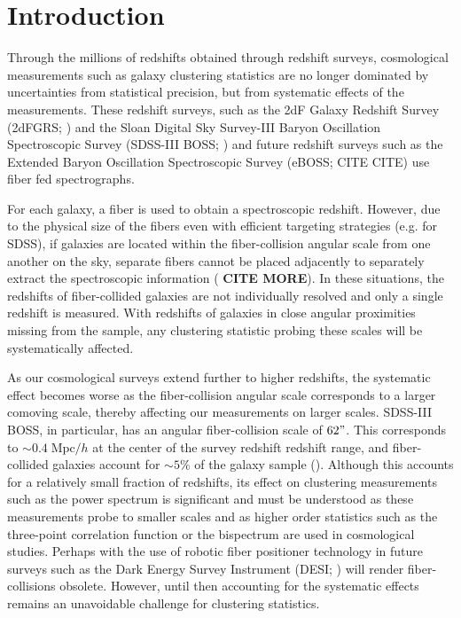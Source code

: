 \documentclass{emulateapj}
\begin{document}
\section{Introduction} 
Through the millions of redshifts obtained through redshift surveys, cosmological measurements such as galaxy clustering statistics are no longer dominated by uncertainties from statistical precision, but from systematic effects of the measurements. These redshift surveys, such as the 2dF Galaxy Redshift Survey (2dFGRS; \citealt{Colless:1999aa}) and the Sloan Digital Sky Survey-III Baryon Oscillation Spectroscopic Survey (SDSS-III BOSS; \citealt{Anderson:2012aa, Dawson:2013aa}) and future redshift surveys such as the Extended Baryon Oscillation Spectroscopic Survey (eBOSS; CITE CITE) use fiber fed spectrographs. 

For each galaxy, a fiber is used to obtain a spectroscopic redshift. However, due to the physical size of the fibers even with efficient targeting strategies (e.g. \citealt{Blanton:2003ab} for SDSS), if galaxies are located within the fiber-collision angular scale from one another on the sky, separate fibers cannot be placed adjacently to separately extract the spectroscopic information (\citealt{Yoon:2008aa} {\bf CITE MORE}). In these situations, the redshifts of fiber-collided galaxies are not individually resolved and only a single redshift is measured. With redshifts of galaxies in close angular proximities missing from the sample, any clustering statistic probing these scales will be systematically affected. 

As our cosmological surveys extend further to higher redshifts, the systematic effect becomes worse as the fiber-collision angular scale corresponds to a larger comoving scale, thereby affecting our measurements on larger scales. SDSS-III BOSS, in particular, has an angular fiber-collision scale of $62"$. This corresponds to $\sim 0.4 \;\mathrm{Mpc}/h$ at the center of the survey redshift redshift range, and fiber-collided galaxies account for $\sim 5\%$ of the galaxy sample (\citealt{Anderson:2012aa}). Although this accounts for a relatively small fraction of redshifts, its effect on clustering measurements such as the power spectrum is significant and must be understood as these measurements probe to smaller scales and as higher order statistics such as the three-point correlation function or the bispectrum are used in cosmological studies. Perhaps with the use of robotic fiber positioner technology in future surveys such as the Dark Energy Survey Instrument (DESI; \citealt{Schlegel:2011aa, Morales:2012aa, Makarem:2014aa}) will render fiber-collisions obsolete. However, until then accounting for the systematic effects remains an unavoidable challenge for clustering statistics. 
\end{document}
